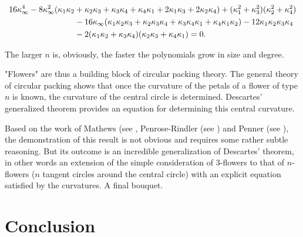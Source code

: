 \documentclass[12pt]{article}
\theoremstyle{définition}
\theoremstyle{remark}
\theoremstyle{plain}
\theoremstyle{plain}
\begin{document}
\begin{align}
16\kappa_\infty^4 - 8\kappa_\infty^2 (\kappa_1\kappa_2 &+ \kappa_2\kappa_3 + \kappa_3\kappa_4 + \kappa_4\kappa_1 + 2 \kappa_1\kappa_3 + 2\kappa_2\kappa_4) + (\kappa_1^2 + \kappa_3^2)(\kappa_2^2+ \kappa_4^2) \notag\\
& - 16 \kappa_\infty(\kappa_1\kappa_2 \kappa_3 + \kappa_2\kappa_3\kappa_4 + \kappa_3\kappa_4\kappa_1 + \kappa_4\kappa_1\kappa_2) - 12\kappa_1\kappa_2\kappa_3\kappa_4 \notag \\
& - 2(\kappa_1\kappa_2+ \kappa_3\kappa_4)(\kappa_2\kappa_3+ \kappa_4\kappa_1) = 0.
\end{align}

The larger $n$ is, obviously, the faster the polynomials grow in size and degree.

"Flowers" are thus a building block of circular packing theory. The general theory of circular packing shows that once the curvature of the petals of a flower of type $n$ is known, the curvature of the central circle is determined. Descartes' generalized theorem provides an equation for determining this central curvature.

Based on the work of Mathews (see \cite{Mat1}, Penrose-Rindler (see \cite{Pen}) and Penner (see \cite{Penn}), the demonstration of this result is not obvious and requires some rather subtle reasoning. But its outcome is an incredible generalization of Descartes' theorem, in other words an extension of the simple consideration of 3-flowers to that of $n$-flowers ($n$ tangent circles around the central circle) with an explicit equation satisfied by the curvatures. A final bouquet.

\section{Conclusion}
\end{document}
